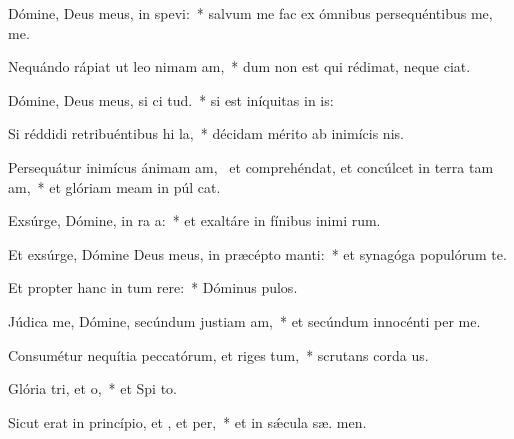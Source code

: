 \item Dómine, Deus meus, in  spevi:~* salvum me fac ex ómnibus persequéntibus me,   me.
\item Nequándo rápiat ut leo nimam am,~* dum non est qui rédimat, neque   ciat.
\item Dómine, Deus meus, si ci tud.~* si est iníquitas in  is:
\item Si réddidi retribuéntibus hi la,~* décidam mérito ab inimícis  nis.
\item Persequátur inimícus ánimam am,~\pscross{} et comprehéndat, et concúlcet in terra tam am,~* et glóriam meam in púl cat.
\item Exsúrge, Dómine, in ra a:~* et exaltáre in fínibus inimi rum.
\item Et exsúrge, Dómine Deus meus, in præcépto  manti:~* et synagóga populórum  te.
\item Et propter hanc in tum rere:~* Dóminus  pulos.
\item Júdica me, Dómine, secúndum justiam am,~* et secúndum innocénti  per me.
\item Consumétur nequítia peccatórum, et riges tum,~* scrutans corda   us.
\item Glória tri, et o,~* et Spi to.
\item Sicut erat in princípio, et , et per,~* et in sǽcula sæ. men.
